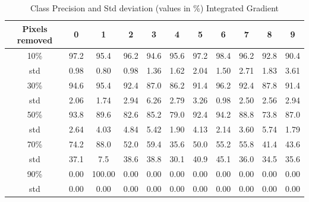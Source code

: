 \documentclass[conference]{IEEEtran}
\begin{document}
\begin{table}[h]
	\centering
	\begin{tabular}{|c|c|c|c|c|c|c|c|c|c|c|}
		\hline
		
		Pixels removed & 0 & 1 & 2 & 3 & 4 & 5 & 6 & 7 & 8 & 9 \\
		\hline
		10\%& 97.2 & 95.4 & 96.2 & 94.6 & 95.6 & 97.2 & 98.4 & 96.2 & 92.8 & 90.4 \\
		std & 0.98 & 0.80 & 0.98 & 1.36 & 1.62 & 2.04 & 1.50 & 2.71 & 1.83 & 3.61 \\
		\hline
		30\% &  94.6 & 95.4 & 92.4 & 87.0 & 86.2 & 91.4 & 96.2 & 92.4 & 87.8 & 91.4 \\
		std & 2.06 & 1.74 & 2.94 & 6.26 & 2.79 & 3.26 & 0.98 & 2.50 & 2.56 & 2.94 \\
		\hline
		50\% &93.8 & 89.6 & 82.6 & 85.2 & 79.0 & 92.4 & 94.2 & 88.8 & 73.8 & 87.0  \\
		std & 2.64 & 4.03 & 4.84 & 5.42 & 1.90 & 4.13 & 2.14 & 3.60 & 5.74 & 1.79 \\
		\hline
		70\% & 74.2 & 88.0 & 52.0 & 59.4 & 35.6 & 50.0 & 55.2 & 55.8 & 41.4 & 43.6  \\
		std & 37.1 & 7.5 & 38.6 & 38.8 & 30.1 & 40.9 & 45.1 & 36.0 & 34.5 & 35.6 \\
		\hline
		90\% & 0.00 & 100.00 & 0.00 & 0.00 & 0.00 & 0.00 & 0.00 & 0.00 & 0.00 & 0.00  \\
		std & 0.00 & 0.00 & 0.00 & 0.00 & 0.00 & 0.00 & 0.00 & 0.00 & 0.00 & 0.00 \\
		\hline
	\end{tabular} \newline
	
	\caption{Class Precision and Std deviation (values in \%) Integrated Gradient}
	\label{tab:sclass_precision_ig}
\end{table}
\end{document}
